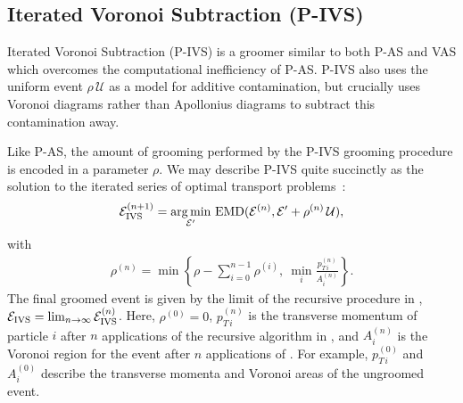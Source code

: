 \subsection{Iterated Voronoi Subtraction (P-IVS)}
\label{sec:ivs}
Iterated Voronoi Subtraction (P-IVS) is a \PIRANHA{} groomer similar to both P-AS and VAS which overcomes the computational inefficiency of P-AS.
%
P-IVS also uses the uniform event \(\rho\,\mathcal U\) as a model for additive contamination, but crucially uses Voronoi diagrams rather than Apollonius diagrams to subtract this contamination away.

Like P-AS, the amount of grooming performed by the P-IVS grooming procedure is encoded in a parameter \(\rho\).
%
We may describe P-IVS quite succinctly as the solution to the iterated series of optimal transport problems~\cite{Komiske:2020qhg}:
\begin{align}
    \mathcal{E}^{(n+1)}_{\rm IVS}
    =
    \underset{\mathcal{E}'}{\arg \min} ~ {\rm EMD}
    (\mathcal{E}^{(n)}, \mathcal{E}' + \rho^{(n)}\,\mathcal{U})
    \label{eqn:ivs1}
    ,
\end{align}
with
\begin{align}
    \rho^{(n)} =
    \min\left\{
    	\rho - \sum_{i=0}^{n-1}\rho^{(i)},
	~
	\min_i \frac{p^{(n)}_{T\,i}}{A^{(n)}_i}
    \right\}
    \label{eqn:ivs2}
    .
\end{align}
%
The final groomed event is given by the limit of the recursive procedure in , \(\mathcal{E}_{\rm IVS} = \lim_{n\to\infty} \mathcal{E}^{(n)}_{\rm IVS}\).
%
Here, \(\rho^{(0)} = 0\), \(p_{T\,i}^{(n)}\) is the transverse momentum of particle \(i\) after \(n\) applications of the recursive algorithm in , and \(A_i^{(n)}\) is the Voronoi region for the event after \(n\) applications of .
%
For example, \(p_{T\, i}^{(0)}\) and \(A_i^{(0)}\) describe the transverse momenta and Voronoi areas of the ungroomed event.

